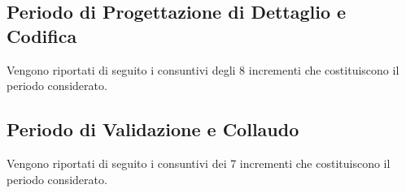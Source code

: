 \subsection{Periodo di Progettazione di Dettaglio e Codifica}
Vengono riportati di seguito i consuntivi degli 8 incrementi che costituiscono il periodo considerato. 











\subsection{Periodo di Validazione e Collaudo}
Vengono riportati di seguito i consuntivi dei 7 incrementi che costituiscono il periodo considerato. 






